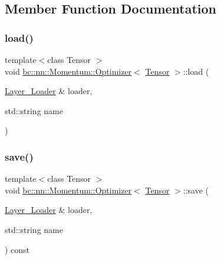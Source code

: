 \subsection{Member Function Documentation}
\mbox{\label{structbc_1_1nn_1_1Momentum_1_1Optimizer_ad33161200f366bc291c9b77b6ca04137}} 
\subsubsection{\texorpdfstring{load()}{load()}}
{\footnotesize\ttfamily template$<$class Tensor $>$ \\
void \hyperlink{structbc_1_1nn_1_1Momentum_1_1Optimizer}{bc\+::nn\+::\+Momentum\+::\+Optimizer}$<$ \hyperlink{namespacebc_a659391e47ab612be3ba6c18cf9c89159}{Tensor} $>$\+::load (\begin{DoxyParamCaption}\item[{\hyperlink{structbc_1_1nn_1_1Layer__Loader}{Layer\+\_\+\+Loader} \&}]{loader,  }\item[{std\+::string}]{name }\end{DoxyParamCaption})\hspace{0.3cm}{\ttfamily [inline]}}

\mbox{\label{structbc_1_1nn_1_1Momentum_1_1Optimizer_a66b94850c3ddec0abe3186305e3354ba}} 
\subsubsection{\texorpdfstring{save()}{save()}}
{\footnotesize\ttfamily template$<$class Tensor $>$ \\
void \hyperlink{structbc_1_1nn_1_1Momentum_1_1Optimizer}{bc\+::nn\+::\+Momentum\+::\+Optimizer}$<$ \hyperlink{namespacebc_a659391e47ab612be3ba6c18cf9c89159}{Tensor} $>$\+::save (\begin{DoxyParamCaption}\item[{\hyperlink{structbc_1_1nn_1_1Layer__Loader}{Layer\+\_\+\+Loader} \&}]{loader,  }\item[{std\+::string}]{name }\end{DoxyParamCaption}) const\hspace{0.3cm}{\ttfamily [inline]}}

